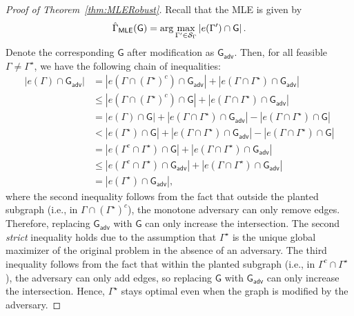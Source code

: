 \documentclass[12pt]{article}
\newcommand{\abs}[1]{\left|#1\right|}
\newcommand{\calS}{{\cal S}}
\newcommand{\s}[1]{\mathsf{#1}}
\begin{document}
\begin{proof}[Proof of Theorem~\ref{thm:MLERobust}]
    Recall that the MLE is given by
    \begin{align}
        \hat{\Gamma}_{\s{MLE}}(\s{G}) = \arg\max_{\Gamma'\in\calS_{\Gamma}}\abs{e(\Gamma')\cap\s{G}}.
    \end{align}
    Denote the corresponding $\s{G}$ after modification as $\s{G}_{\s{adv}}$. Then, for all feasible $\Gamma\neq\Gamma^\star$, we have the following chain of inequalities:
    \begin{align}
        \abs{e(\Gamma)\cap\s{G}_{\s{adv}}} &= \abs{e(\Gamma\cap(\Gamma^\star)^c)\cap\s{G}_{\s{adv}}}+\abs{e(\Gamma\cap\Gamma^\star)\cap\s{G}_{\s{adv}}}\\
        &\leq\abs{e(\Gamma\cap(\Gamma^\star)^c)\cap\s{G}}+\abs{e(\Gamma\cap\Gamma^\star)\cap\s{G}_{\s{adv}}}\\
        & = \abs{e(\Gamma)\cap\s{G}}+\abs{e(\Gamma\cap\Gamma^\star)\cap\s{G}_{\s{adv}}}-\abs{e(\Gamma\cap\Gamma^\star)\cap\s{G}}\\
        &<\abs{e(\Gamma^\star)\cap\s{G}}+\abs{e(\Gamma\cap\Gamma^\star)\cap\s{G}_{\s{adv}}}-\abs{e(\Gamma\cap\Gamma^\star)\cap\s{G}}\\
        & = \abs{e(\Gamma^c\cap\Gamma^\star)\cap\s{G}}+\abs{e(\Gamma\cap\Gamma^\star)\cap\s{G}_{\s{adv}}}\\
        & \leq  \abs{e(\Gamma^c\cap\Gamma^\star)\cap\s{G}_{\s{adv}}}+\abs{e(\Gamma\cap\Gamma^\star)\cap\s{G}_{\s{adv}}}\\
        & = \abs{e(\Gamma^\star)\cap\s{G}_{\s{adv}}},
    \end{align}
    where the second inequality follows from the fact that outside the planted subgraph (i.e., in  $\Gamma\cap(\Gamma^\star)^c$), the monotone adversary can only remove edges. Therefore, replacing $\s{G}_{\s{adv}}$ with $\s{G}$ can only increase the intersection. The second \emph{strict} inequality holds due to the assumption that $\Gamma^\star$ is the unique global maximizer of the original problem in the absence of an adversary. The third inequality follows from the fact that within the planted subgraph (i.e., in $\Gamma^c\cap\Gamma^\star$), the adversary can only add edges, so replacing $\s{G}$ with $\s{G}_{\s{adv}}$ can only increase the intersection. Hence, $\Gamma^\star$ stays optimal even when the graph is modified by the adversary.
\end{proof}
\end{document}
